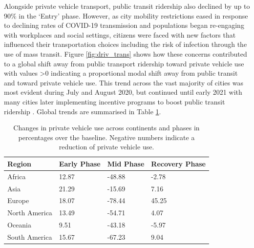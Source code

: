 \documentclass[preprint,10pt]{elsarticle} %
\begin{document}
Alongside private vehicle transport, public transit ridership also declined by up to 90\% in the `Entry' phase\cite{TransitCovid_Gkiotsalitis}. However, as city mobility restrictions eased in response to declining rates of COVID-19 transmission and populations began re-engaging with workplaces and social settings, citizens were faced with new factors that influenced their transportation choices including the risk of infection through the use of mass transit\cite{BECKTransit}. Figure \ref{fig:driv_trans} shows how these concerns contributed to a global shift away from public transport ridership toward private vehicle use with values \textgreater 0 indicating a proportional modal shift away from public transit and toward private vehicle use. This trend across the vast majority of cities was most evident during July and August 2020, but continued until early 2021 with many cities later implementing incentive programs to boost public transit ridership \cite{dai2021improving}. Global trends are summarised in Table \ref{tab:driving}.

\begin{table}
\caption{Changes in private vehicle use across continents and phases in percentages over the baseline. Negative numbers indicate a reduction of private vehicle use.}
\begin{tabular}{ |l|l|l|l| }
\hline
\textbf{Region} & \textbf{Early Phase} & \textbf{Mid Phase} & \textbf{Recovery Phase}  \\ 
\hline
Africa         & \cellcolor{red!12}12.87 & \cellcolor{blue!15}-48.88 & \cellcolor{blue!10}-2.78  \\ \hline
Asia           & \cellcolor{red!15}21.29 & \cellcolor{blue!10}-15.69 & \cellcolor{red!10} 7.16  \\ \hline
Europe         & \cellcolor{red!13}18.07 & \cellcolor{blue!20}-78.44 & \cellcolor{red!25} 45.25  \\ \hline
North America  & \cellcolor{red!12}13.49 & \cellcolor{blue!16}-54.71 & \cellcolor{red!10}4.07  \\ \hline
Oceania        &  \cellcolor{red!10}9.51 & \cellcolor{blue!15}-43.18 & \cellcolor{blue!10}-5.97  \\ \hline
South America  & \cellcolor{red!12}15.67 & \cellcolor{blue!18}-67.23 & \cellcolor{red!10}9.04  \\ \hline
\end{tabular}\label{tab:driving}
\end{table}
\end{document}

